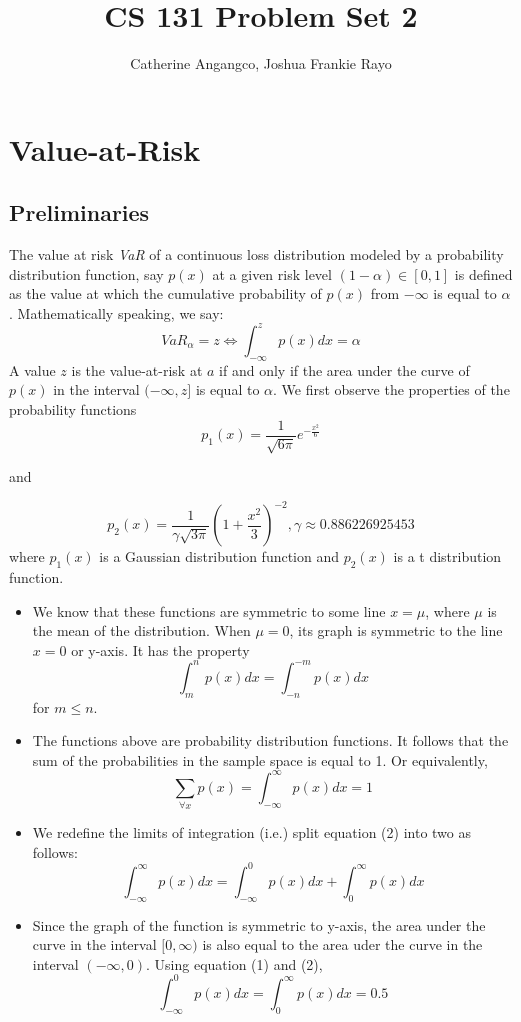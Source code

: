 \documentclass[10pt, twocolumn]{article}
\begin{document}
	\title{\textbf{CS 131 Problem Set 2}}
	\author {Catherine Angangco, Joshua Frankie Rayo}
	\maketitle
	
	\section{Value-at-Risk}
		\subsection{Preliminaries}
		The value at risk \textit{VaR} of a continuous loss distribution modeled by a probability distribution function, say $p(x)$ at a given risk level $(1-\alpha)\in[0,1]$ is defined as the value at which the cumulative probability of $p(x)$ from $-\infty$ is equal to $\alpha$.
		Mathematically speaking, we say:
		$$VaR_{\alpha} = z \Leftrightarrow \int^{z}_{-\infty}p(x)dx=\alpha
		$$
		A value $z$ is the value-at-risk at $a$ if and only if the area under the curve of $p(x)$ in the interval $(-\infty,z]$ is equal to $\alpha$.
		We first observe the properties of the probability functions 
		$$p_1(x)=\frac{1}{\sqrt{6\pi}}e^{-\frac{x^2}{6}}$$ 
		\begin{center}
			and
		\end{center}
		 $$ p_2(x)=\frac{1}{\gamma\sqrt{3\pi}}\left(1+\frac{x^2}{3}\right)^{-2}, \gamma\approx0.886226925453$$
		where $p_1(x)$ is a Gaussian distribution function and $p_2(x)$ is a t distribution function.
		\begin{itemize}
			\item We know that these functions are symmetric to some line $x=\mu$, where $\mu$ is the mean of the distribution.
				When $\mu=0$, its graph is symmetric to the line $x=0$ or y-axis. It has the property
				$$
					\int^{n}_{m}p(x)dx=\int^{-m}_{-n}p(x)dx
				$$
				for $m\leq n$.
			\item The functions above are probability distribution functions. It follows that the sum of the probabilities in the sample space is equal to 1. Or equivalently,
				\begin{equation}
					\sum_{\forall x}p(x)=\int_{-\infty}^{\infty}p(x)dx=1
				\end{equation}
			\item We redefine the limits of integration (i.e.) split equation (2) into two as follows:
				\begin{equation}
					\int_{-\infty}^{\infty}p(x)dx=\int_{-\infty}^{0}p(x)dx + \int_{0}^{\infty}p(x)dx
				\end{equation}
			\item Since the graph of the function is symmetric to y-axis, the area under the curve in the interval $[0,\infty)$ is also equal to the area uder the curve in the interval $(-\infty,0)$. Using equation (1) and (2),
				\begin{equation}
					\int_{-\infty}^{0}p(x)dx = \int_{0}^{\infty}p(x)dx = 0.5
				\end{equation}
		\end{itemize}
\end{document}
